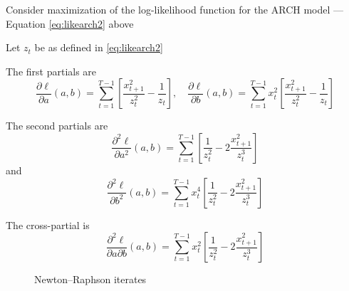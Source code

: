 \begin{frame}
    
    \vspace{2em}
    Consider maximization of the log-likelihood function for the ARCH model --- Equation \eqref{eq:likearch2} above
    
    Let $z_t$ be as defined in \eqref{eq:likearch2}
    
    \vspace{.7em}
    The first partials are
    \begin{equation*}
        \frac{\partial \ell}{\partial a} (a,b) 
        = 
        \sum_{t=1}^{T-1}
        \left[
                \frac{x_{t+1}^2}{z_t^2} - \frac{1}{z_t}
            \right],
        \quad
        \frac{\partial \ell}{\partial b} (a,b) 
        = 
        \sum_{t=1}^{T-1}
             x_t^2 \left[ 
                \frac{x_{t+1}^2}{z_t^2} - \frac{1}{z_t}
            \right]  
    \end{equation*}
    
\end{frame}

\begin{frame}

    \vspace{2em}
    The second partials are
    \begin{equation*}
        \frac{\partial^2 \ell}{\partial a^2} (a,b) = 
        \sum_{t=1}^{T-1}
        \left[
                \frac{1}{z_t^2} - 2 \frac{x_{t+1}^2}{z_t^3}  
            \right]
    \end{equation*}
    and 
    \begin{equation*}
        \frac{\partial^2 \ell}{\partial b^2} (a,b) 
        = 
        \sum_{t=1}^{T-1} x_t^4
        \left[
                \frac{1}{z_t^2} - 2 \frac{x_{t+1}^2}{z_t^3}  
            \right]
    \end{equation*}
    
    \vspace{.7em}
    The cross-partial is
    \begin{equation*}
        \frac{\partial^2 \ell}{\partial a \partial b} (a,b) 
        = 
        \sum_{t=1}^{T-1} x_t^2
        \left[
                \frac{1}{z_t^2} - 2 \frac{x_{t+1}^2}{z_t^3}  
            \right]
    \end{equation*}
\end{frame}

\begin{frame}

    \begin{figure}
   \begin{center}
    \caption{\label{f:nr} Newton--Raphson iterates}
   \end{center}
    \end{figure}

\end{frame}


